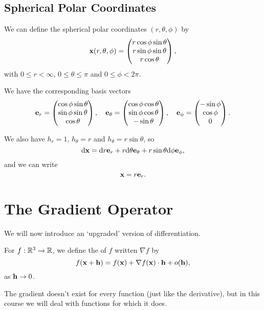 \documentclass[a4paper]{scrreprt}
\begin{document}
 \subsection{Spherical Polar Coordinates}

 We can define the spherical polar coordinates $(r, \theta, \phi)$ by
 $$
\mathbf{x}(r, \theta, \phi) = \begin{pmatrix}
	r \cos \phi \sin \theta \\
	r \sin \phi \sin \theta \\
	r \cos \theta
\end{pmatrix},
 $$
 with $0 \leq r < \infty$, $0 \leq \theta \leq \pi$ and $0 \leq \phi < 2 \pi$.

 We have the corresponding basis vectors
$$
\mathbf{e}_r = \begin{pmatrix}
	\cos \phi \sin \theta \\
	\sin \phi \sin \theta \\
	\cos \theta
\end{pmatrix}, \quad \mathbf{e}_\theta = \begin{pmatrix}
	\cos \phi \cos \theta \\
	\sin \phi \cos \theta \\
	-\sin \theta
\end{pmatrix}, \quad \mathbf{e}_\phi = \begin{pmatrix}
	-\sin \phi \\
	\cos \phi \\
	 0
\end{pmatrix}.
$$

We also have $h_r = 1$, $h_\theta = r$ and $h_{\theta} = r \sin \theta$, so
$$
\mathrm{d} \mathbf{x} = \mathrm{d} r \mathbf{e}_r + r \mathrm{d} \theta \mathbf{e}_{\theta} + r \sin \theta \mathrm{d} \phi \mathbf{e}_\phi,
$$
and we can write
$$
\mathbf{x} = r \mathbf{e}_r.
$$

\section{The Gradient Operator}

We will now introduce an `upgraded' version of differentiation.

\begin{definition}[Gradient]
	For $f : \mathbb{R}^3 \rightarrow \mathbb{R}$, we define the  of $f$ written $\nabla f$ by
	$$
	f(\mathbf{x} + \mathbf{h}) = f(\mathbf{x}) + \nabla f(\mathbf{x}) \cdot \mathbf{h} + o(\mathbf{h}),
	$$
	as $\mathbf{h} \rightarrow 0$.
\end{definition}

The gradient doesn't exist for every function (just like the derivative), but in this course we will deal with functions for which it does.
\end{document}
